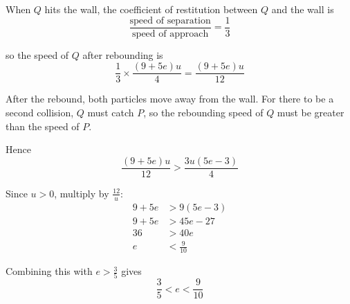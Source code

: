 \documentclass[leqno]{article}
\begin{document}
\begin{enumerate}[
  label=\textbf{\arabic*.},
  leftmargin=*,
  topsep=0pt,
  partopsep=0pt,
  parsep=0pt
]
\begin{djsSolution}
\begin{enumerate}[label=\textbf{(\alph*)}]
  When $Q$ hits the wall, the coefficient of restitution between $Q$ and the wall is
  \[
  \frac{\text{speed of separation}}{\text{speed of approach}}=\frac13
  \]

  so the speed of $Q$ after rebounding is
  \[
  \frac13\times \frac{(9+5e)u}{4}=\frac{(9+5e)u}{12}
  \]

  After the rebound, both particles move away from the wall. For there to be a second collision, $Q$ must catch $P$, so the rebounding speed of $Q$ must be greater than the speed of $P$.

  Hence
  \[
  \frac{(9+5e)u}{12}>\frac{3u(5e-3)}{4}
  \]

  Since $u>0$, multiply by $\frac{12}{u}$:
  \begin{align*}
  9+5e&>9(5e-3) \\
  9+5e&>45e-27 \\
  36&>40e \\
  e&<\frac{9}{10}
  \end{align*}

  Combining this with $e>\frac35$ gives
  \[
  \frac35<e<\frac9{10}
  \]

\end{enumerate}
\end{djsSolution}


\end{enumerate}
\end{document}
